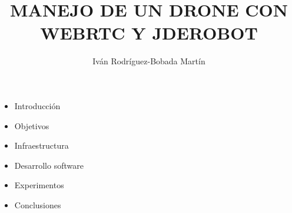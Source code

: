 \documentclass[notes,slidesec,a4]{seminar}
\title{MANEJO DE UN DRONE CON
 WEBRTC Y JDEROBOT}
\author{Iván Rodríguez-Bobada Martín}
\begin{document}
\maketitle


\begin{hslide}
\begin{itemize}
\item Introducción 
\item Objetivos
\item Infraestructura
\item Desarrollo software
\item Experimentos
\item Conclusiones
\end{itemize}
\end{hslide}


\end{document}
